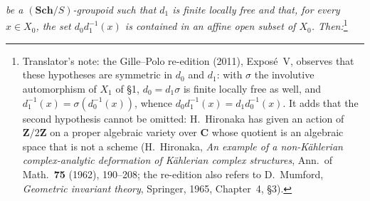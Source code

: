\textit{be a \((\mathbf{Sch}/S)\)-groupoid such that
\label{thm:sga3-V-4.1-a}\(d_1\) is finite locally free and that,
\label{thm:sga3-V-4.1-b}for every \(x\in X_0\), the set
\(d_0d_1^{-1}(x)\) is contained in an affine open subset of
\(X_0\). Then:}\footnote{Translator's note: the Gille--Polo re-edition (2011), Exposé~V, observes
that these hypotheses are symmetric in \(d_0\) and \(d_1\): with \(\sigma\) the
involutive automorphism of \(X_1\) of \S1, \(d_0=d_1\sigma\) is finite locally
free as well, and \(d_1^{-1}(x)=\sigma(d_0^{-1}(x))\), whence
\(d_0d_1^{-1}(x)=d_1d_0^{-1}(x)\). It adds that the second hypothesis cannot be
omitted: H.~Hironaka has given an action of \(\mathbf Z/2\mathbf Z\) on a proper
algebraic variety over \(\mathbf C\) whose quotient is an algebraic space that
is not a scheme (H.~Hironaka, \emph{An example of a non-Kählerian
complex-analytic deformation of Kählerian complex structures}, Ann.\ of
Math.\ \textbf{75} (1962), 190--208; the re-edition also refers to D.~Mumford,
\emph{Geometric invariant theory}, Springer, 1965, Chapter~4, \S3).}
